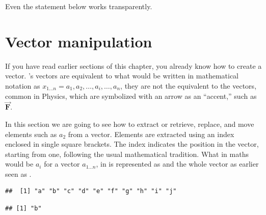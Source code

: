 \documentclass[krantz2]{krantz}\usepackage{knitr}
\begin{document}
\begin{explainbox}
Even the statement below works transparently.

\begin{knitrout}\footnotesize
{}\color{fgcolor}\begin{kframe}
\begin{alltt}
\hlstd{a[}\hlstd{]} \hlkwb{<-} \hlstd{b[}\hlstd{]}
\end{alltt}
\end{kframe}
\end{knitrout}
\end{explainbox}


\section{Vector manipulation}\label{sec:vectors}\label{sec:calc:indexing}
If you have read earlier sections of this chapter, you already know how to create a vector. \Rlang's vectors are equivalent to what would be written in mathematical notation as $x_{1\ldots n} = a_1, a_2, \ldots, a_i, \ldots, a_n$, they are not the equivalent to the vectors, common in Physics, which are symbolized with an arrow as an ``accent,'' such as $\overrightarrow{\mathbf{F}}$.

In this section we are going to see how to extract or retrieve, replace, and move elements such as $a_2$ from a vector. Elements are extracted using an index enclosed in single square brackets. The index indicates the position in the vector, starting from one, following the usual mathematical tradition. What in maths would be $a_i$ for a vector $a_{1\ldots n}$, in \Rpgrm is represented as  and the whole vector as earlier seen as .

\begin{knitrout}\footnotesize
{}\color{fgcolor}\begin{kframe}
\begin{alltt}
 \hlkwb{<-} \hlstd{letters[}\hlopt{:}\hlstd{]}
\end{alltt}
\begin{verbatim}
##  [1] "a" "b" "c" "d" "e" "f" "g" "h" "i" "j"
\end{verbatim}
\begin{alltt}
\hlstd{a[}\hlstd{]}
\end{alltt}
\begin{verbatim}
## [1] "b"
\end{verbatim}
\end{kframe}
\end{knitrout}
\end{document}

